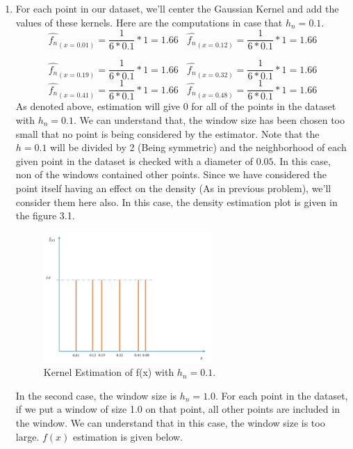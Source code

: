 \documentclass[12pt]{article}
\numberwithin{equation}{section}
\numberwithin{table}{section}
\numberwithin{figure}{section}
\begin{document}
\begin{enumerate}[label=(\alph*)]
	\item For each point in our dataset, we'll center the Gaussian Kernel and add the values of these kernels. Here are the computations in case that $h_n = 0.1$.
	$$
	\hat{f_n}_{(x = 0.01)} = \frac{1}{6*0.1} *1  = 1.66 \ \ \ \ \hat{f_n}_{(x = 0.12)} = \frac{1}{6*0.1} * 1= 1.66
	$$

	$$
	\hat{f_n}_{(x = 0.19)} = \frac{1}{6*0.1} * 1 = 1.66 \ \ \ \ \hat{f_n}_{(x = 0.32)} = \frac{1}{6*0.1} * 1 = 1.66
	$$
	$$
	\hat{f_n}_{(x = 0.41)} = \frac{1}{6*0.1} * 1 = 1.66\ \ \ \ 	\hat{f_n}_{(x = 0.48)} = \frac{1}{6*0.1} * 1 = 1.66
	$$
	As denoted above, estimation will give 0 for all of the points in the dataset with $h_n = 0.1$. We can understand that, the window size has been chosen too small that no point is being considered by the estimator. Note that the $h = 0.1$ will be divided by 2 (Being symmetric) and the neighborhood of each given point in the dataset is checked with a diameter of $0.05$. In this case, non of the windows contained other points. Since we have considered the point itself having an effect on the density (As in previous problem), we'll consider them here also.
	In this case, the density estimation plot is given in the figure 3.1.
	\begin{figure}[!h]\centering
	\includegraphics[width=0.6\textwidth]{2_a_1.PNG}
	\caption{Kernel Estimation of f(x) with $h_n = 0.1$.}
	\label{pl1}
	\end{figure}
	
	In the second case, the window size is $h_n = 1.0$. For each point in the dataset, if we put a window of size 1.0 on that point, all other points are included in the window. We can understand that in this case, the window size is too large. $f(x)$ estimation is given below.
	

\end{enumerate}
\end{document}
